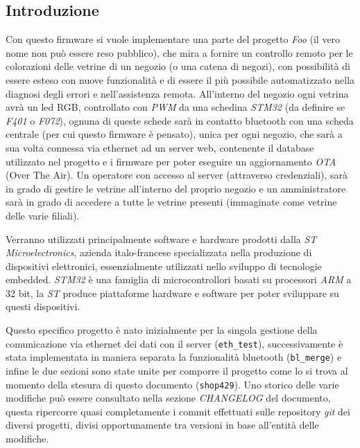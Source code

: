 \subsection{Introduzione}

Con questo firmware si vuole implementare una parte del progetto \textit{Foo} (il vero nome non pu\`o essere reso pubblico), che mira a fornire un controllo remoto per le colorazioni delle vetrine di un negozio (o una catena di negozi), con possibilit\`a di essere esteso con nuove funzionalit\`a e di essere il pi\`u possibile automatizzato nella diagnosi degli errori e nell'assistenza remota. All'interno del negozio ogni vetrina avr\`a un led RGB, controllato con \textit{PWM} da una schedina \textit{STM32} (da definire se \textit{F401} o \textit{F072}), ognuna di queste schede sar\`a in contatto bluetooth con una scheda centrale (per cui questo firmware \`e pensato), unica per ogni negozio, che sar\`a a sua volta connessa via ethernet ad un server web, contenente il database utilizzato nel progetto e i firmware per poter eseguire un aggiornamento \textit{OTA} (Over The Air). Un operatore con accesso al server (attraverso credenziali), sar\`a in grado di gestire le vetrine all'interno del proprio negozio e un amministratore sar\`a in grado di accedere a tutte le vetrine presenti (immaginate come vetrine delle varie filiali).

Verranno utilizzati principalmente software e hardware prodotti dalla \textit{ST Microelectronics}, azienda italo-francese specializzata nella produzione di dispositivi elettronici, essenzialmente utilizzati nello sviluppo di tecnologie embedded. \textit{STM32} \`e una famiglia di microcontrollori basati su processori \textit{ARM} a 32 bit, la \textit{ST} produce piattaforme hardware e software per poter sviluppare su questi dispositivi.

Questo specifico progetto \`e nato inizialmente per la singola gestione della comunicazione via ethernet dei dati con il server (\texttt{eth\_test}), successivamente \`e stata implementata in maniera separata la funzionalit\`a bluetooth (\texttt{bl\_merge}) e infine le due sezioni sono state unite per comporre il progetto come lo si trova al momento della stesura di questo documento (\texttt{shop429}). Uno storico delle varie modifiche pu\`o essere consultato nella sezione \textit{CHANGELOG} del documento, questa ripercorre quasi completamente i commit effettuati sulle repository \textit{git} dei diversi progetti, divisi opportunamente tra versioni in base all'entit\`a delle modifiche.

